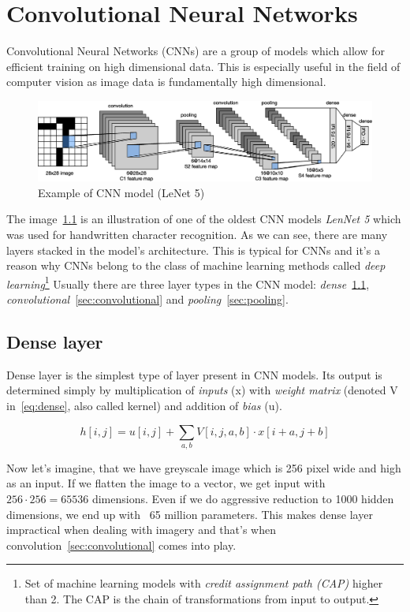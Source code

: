 \chapter{Convolutional Neural Networks}\label{ch:cnn}
Convolutional Neural Networks (CNNs) are a group of models which allow for efficient training on high dimensional data.
This is especially useful in the field of computer vision as image data is fundamentally high dimensional.

\begin{figure}[H]
    \centering
    \includegraphics[width=\columnwidth]{images/cnn/lenet.eps}
    \caption{Example of CNN model (LeNet 5)~\cite{LeNet5}}
    \label{fig:cnn}
\end{figure}

The image~\ref{fig:cnn} is an illustration of one of the oldest CNN models \textit{LenNet 5} which was used for
handwritten character recognition.
As we can see, there are many layers stacked in the model's architecture.
This is typical for CNNs and it's a reason why CNNs belong to the class of machine learning methods called
\textit{deep learning}\footnote{Set of machine learning models with
\textit{credit assignment path (CAP)} higher than 2.
The CAP is the chain of transformations from input to output.}
Usually there are three layer types in the CNN model: \textit{dense}~\ref{sec:dense},
\textit{convolutional}~\ref{sec:convolutional} and \textit{pooling}~\ref{sec:pooling}.

\section{Dense layer}\label{sec:dense}
Dense layer is the simplest type of layer present in CNN models.
Its output is determined simply by multiplication of \textit{inputs} (x) with \textit{weight matrix}
(denoted V in~\ref{eq:dense}, also called kernel) and addition of \textit{bias} (u).

\begin{equation}
    \label{eq:dense}
    h[i, j] = u[i,j] + \sum_{a,b} V[i,j,a,b] \cdot x[i+a,j+b]
\end{equation}

Now let's imagine, that we have greyscale image which is 256 pixel wide and high as an input.
If we flatten the image to a vector, we get input with $256\cdot256 = 65536$ dimensions.
Even if we do aggressive reduction to 1000 hidden dimensions, we end up with ~65 million parameters.
This makes dense layer impractical when dealing with imagery and that's when convolution~\ref{sec:convolutional} comes
into play.

